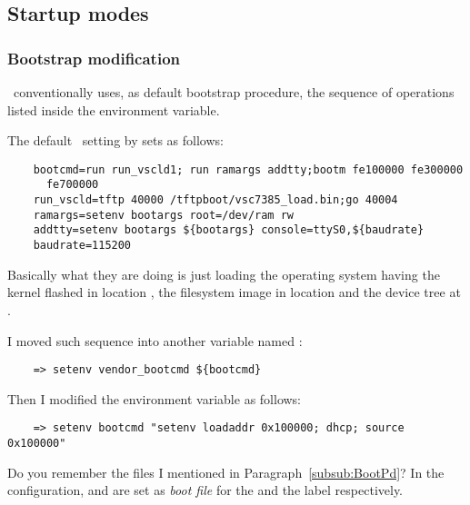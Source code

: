 \subsection{ Startup modes } \label{sub:StartupModes}

    \subsubsection{Bootstrap modification}

        \uBoot\ conventionally uses, as default bootstrap procedure, the
        sequence of operations listed inside the 
        environment variable.

        The default \uBoot\ setting by  sets
         as follows:
\begin{lstlisting}
    bootcmd=run run_vscld1; run ramargs addtty;bootm fe100000 fe300000
      fe700000
    run_vscld=tftp 40000 /tftpboot/vsc7385_load.bin;go 40004 
    ramargs=setenv bootargs root=/dev/ram rw
    addtty=setenv bootargs ${bootargs} console=ttyS0,${baudrate}
    baudrate=115200
\end{lstlisting}

        Basically what they are doing is just loading the operating system
        having the kernel flashed in location , the
        filesystem image in location  and the device
        tree at .

        I moved such sequence into another variable named
        :
\begin{lstlisting}
    => setenv vendor_bootcmd ${bootcmd}
\end{lstlisting}
    Then I modified the  environment variable as follows:
\begin{lstlisting}
    => setenv bootcmd "setenv loadaddr 0x100000; dhcp; source 0x100000"
\end{lstlisting}

        Do you remember the files I mentioned in
        Paragraph~\ref{subsub:BootPd}? In the 
        configuration,  and
         are set as \emph{boot file} for the
         and the  label respectively.


